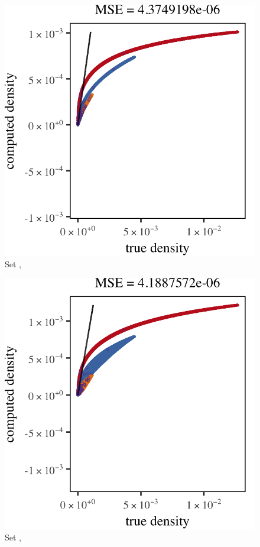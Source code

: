 \begin{subfigure}{0.23\textwidth}
	\centering
	\includegraphics[keepaspectratio=true, width=\textwidth, height=0.23\textheight]{result/img/all/results_ferdosi_3_120000_mbe_silverman.png}
	\caption{Set \ferdosiThree, \mbe}
	\label{fig:results:multisphere:mbe:ferdosi3}
\end{subfigure}
\begin{subfigure}{0.23\textwidth}
	\centering
	\includegraphics[keepaspectratio=true, width=\textwidth, height=0.23\textheight]{result/img/all/results_baakman_3_120000_mbe_silverman}
	\caption{Set \baakmanThree, \mbe}
	\label{fig:results:multisphere:mbe:baakman3}
\end{subfigure}	
